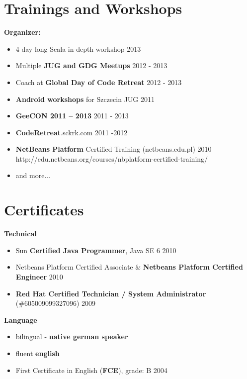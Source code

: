 \documentclass{res}
\begin{document}
\begin{resume}
\section{Trainings and Workshops}
{\bf Organizer:}
\begin{itemize}
 \item 4 day long Scala in-depth workshop \hfill 2013
 \item Multiple \textbf{JUG and GDG Meetups} \hfill 2012 - 2013
 \item Coach at \textbf{Global Day of Code Retreat} \hfill 2012 - 2013
 \item \textbf{Android workshops} for Szczecin JUG \hfill 2011
 \item \textbf{GeeCON 2011 -- 2013} \hfill 2011 - 2013
 \item \textbf{CodeRetreat}.sckrk.com \hfill 2011 -2012
 \item \textbf{NetBeans Platform} Certified Training (netbeans.edu.pl) \hfill 2010 \\
	http://edu.netbeans.org/courses/nbplatform-certified-training/ 
 \item and more...
\end{itemize}

\section{Certificates} 
{\bf Technical}
\begin{itemize}
 \item Sun \textbf{Certified Java Programmer}, Java SE 6 \hfill 2010
 \item Netbeans Platform Certified Associate \& \textbf{Netbeans Platform Certified Engineer} \hfill 2010
 \item \textbf{Red Hat Certified Technician / System Administrator} (\#605009099327096) \hfill 2009\\
\end{itemize}
{\bf Language}
\begin{itemize}
 \item bilingual - \textbf{native german speaker}
 \item fluent \textbf{english}
 \item First Certificate in English (\textbf{FCE}), grade: B \hfill 2004
\end{itemize}


\end{resume}
\end{document}

